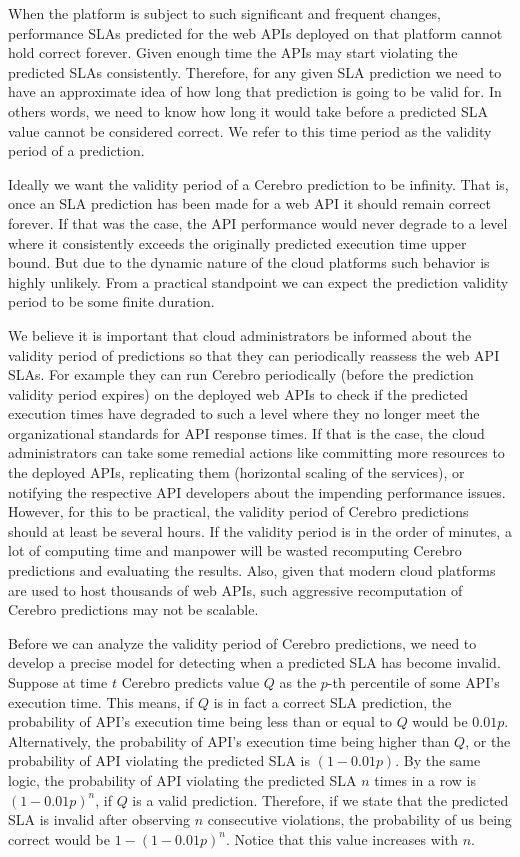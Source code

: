 When the platform is subject to such significant and frequent changes, performance SLAs predicted for the web APIs deployed on that
platform cannot hold correct forever. Given enough time the APIs may start violating the predicted SLAs consistently. Therefore, for any
given SLA prediction we need to have an approximate idea of how long that prediction is going to be valid for. In others words, we need
to know how long it would take before a predicted SLA value cannot be considered correct. We refer to this time period as the validity
period of a prediction.

Ideally we want the validity period of a Cerebro prediction to be infinity. That is, once an SLA prediction has been made for a web API it
should remain correct forever. If that was the case, the API performance would never degrade to a level where it
consistently exceeds the originally predicted execution time upper bound. But due to the dynamic nature of the cloud platforms such
behavior is highly unlikely. From a practical standpoint we can expect the prediction validity period to be some finite duration. 

We believe
it is important that cloud administrators be informed about the validity period of predictions so that they can periodically reassess the web
API SLAs. For example they can run Cerebro periodically (before the prediction validity period expires) on the deployed web APIs to check
if the predicted execution times have degraded to such a level where they no longer meet the organizational standards for API
response times. If that is the case, the cloud administrators can take some remedial actions like committing more resources to the deployed APIs,
replicating them (horizontal scaling of the services), or notifying the respective API developers about the impending performance issues. However,
for this to be practical, the validity period of Cerebro predictions should at least be several hours. If the validity period is in the order of minutes,
a lot of computing time and manpower will be wasted recomputing Cerebro predictions and evaluating the results. Also, given that
modern cloud platforms are used to host thousands of web APIs, such aggressive recomputation of Cerebro predictions may not be scalable.

Before we can analyze the validity period of Cerebro predictions, we need to develop a precise model for detecting when a predicted SLA
has become invalid. Suppose at time $t$ Cerebro predicts value $Q$ as the $p$-th percentile of some API's execution time.
This means, if $Q$ is in fact a correct SLA prediction, the probability of API's execution time being less than or equal to $Q$ would be $0.01p$. 
Alternatively, the probability
of API's execution time being higher than $Q$, or the probability of API violating the predicted SLA is $(1-0.01p)$. By the same logic, 
the probability of API violating the predicted SLA $n$ times in a row is $(1-0.01p)^n$, if $Q$ is a valid prediction. 
Therefore, if we state that the 
predicted SLA is invalid after observing $n$ consecutive violations, the probability of us being correct would be $1 - (1-0.01p)^n$. 
Notice that this value increases with $n$. 

